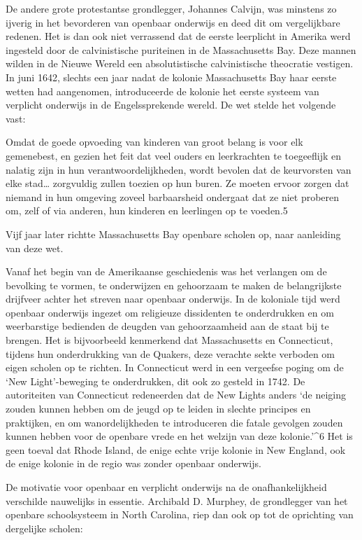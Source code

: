 \documentclass[
  a5paper,
  smalldemyvopaper,10pt,twoside,onecolumn,openright,extrafontsizes,hidelinks]{memoir}
\renewenvironment{quote}%
               {\list{}{\rightmargin=.6cm\leftmargin=.6cm}%
                \itshape \item[]}%
               {\endlist}
\begin{document}
De andere grote protestantse grondlegger, Johannes Calvijn, was minstens
zo ijverig in het bevorderen van openbaar onderwijs en deed dit om
vergelijkbare redenen. Het is dan ook niet verrassend dat de eerste
leerplicht in Amerika werd ingesteld door de calvinistische puriteinen
in de Massachusetts Bay. Deze mannen wilden in de Nieuwe Wereld een
absolutistische calvinistische theocratie vestigen. In juni 1642,
slechts een jaar nadat de kolonie Massachusetts Bay haar eerste wetten
had aangenomen, introduceerde de kolonie het eerste systeem van
verplicht onderwijs in de Engelssprekende wereld. De wet stelde het
volgende vast:

\begin{quote}
Omdat de goede opvoeding van kinderen van groot belang is voor elk
gemenebest, en gezien het feit dat veel ouders en leerkrachten te
toegeeflijk en nalatig zijn in hun verantwoordelijkheden, wordt bevolen
dat de keurvorsten van elke stad\ldots{} zorgvuldig zullen toezien op
hun buren. Ze moeten ervoor zorgen dat niemand in hun omgeving zoveel
barbaarsheid ondergaat dat ze niet proberen om, zelf of via anderen, hun
kinderen en leerlingen op te voeden.5
\end{quote}

Vijf jaar later richtte Massachusetts Bay openbare scholen op, naar
aanleiding van deze wet.

Vanaf het begin van de Amerikaanse geschiedenis was het verlangen om de
bevolking te vormen, te onderwijzen en gehoorzaam te maken de
belangrijkste drijfveer achter het streven naar openbaar onderwijs. In
de koloniale tijd werd openbaar onderwijs ingezet om religieuze
dissidenten te onderdrukken en om weerbarstige bedienden de deugden van
gehoorzaamheid aan de staat bij te brengen. Het is bijvoorbeeld
kenmerkend dat Massachusetts en Connecticut, tijdens hun onderdrukking
van de Quakers, deze verachte sekte verboden om eigen scholen op te
richten. In Connecticut werd in een vergeefse poging om de `New
Light'-beweging te onderdrukken, dit ook zo gesteld in 1742. De
autoriteiten van Connecticut redeneerden dat de New Lights anders `de
neiging zouden kunnen hebben om de jeugd op te leiden in slechte
principes en praktijken, en om wanordelijkheden te introduceren die
fatale gevolgen zouden kunnen hebben voor de openbare vrede en het
welzijn van deze kolonie.'\^{}6 Het is geen toeval dat Rhode Island, de
enige echte vrije kolonie in New England, ook de enige kolonie in de
regio was zonder openbaar onderwijs.

De motivatie voor openbaar en verplicht onderwijs na de
onafhankelijkheid verschilde nauwelijks in essentie. Archibald D.
Murphey, de grondlegger van het openbare schoolsysteem in North
Carolina, riep dan ook op tot de oprichting van dergelijke scholen:
\end{document}

